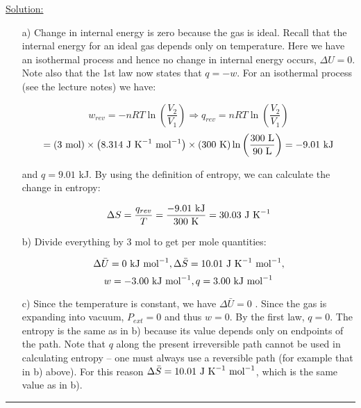 \noindent
\underline{Solution:}\\

\begin{itemize}

\item[a)] Change in internal energy is zero because the gas is ideal. Recall that the internal energy for an ideal gas depends only on temperature. Here we have an isothermal process and hence no change in internal energy occurs, $\Delta U = 0$. Note also that the 1st law now states that $q = -w$. For an isothermal process (see the lecture notes) we have:

$$w_{rev} = -nRT\ln\left(\frac{V_2}{V_1}\right) \Rightarrow q_{rev} = nRT\ln\left(\frac{V_2}{V_1}\right)$$
$$ = \left(3\textnormal{ mol}\right)\times\left(8.314\textnormal{ J K}^{-1}\textnormal{ mol}^{-1}\right)\times\left(300\textnormal{ K}\right)\ln\left(\frac{300\textnormal{ L}}{90\textnormal{ L}}\right) = -9.01\textnormal{ kJ}$$

and $q = 9.01$ kJ. By using the definition of entropy, we can calculate the change in entropy:

$$\Delta S = \frac{q_{rev}}{T} = \frac{-9.01\textnormal{ kJ}}{300\textnormal{ K}} = 30.03\textnormal{ J K}^{-1}$$

\item[b)] Divide everything by 3 mol to get per mole quantities:

$$\Delta\bar{U} = 0\textnormal{ kJ mol}^{-1}, \Delta\bar{S} = 10.01\textnormal{ J K}^{-1}\textnormal{ mol}^{-1},$$
$$ w = -3.00\textnormal{ kJ mol}^{-1}, q = 3.00\textnormal{ kJ mol}^{-1}$$

\item[c)] Since the temperature is constant, we have $\Delta\bar{U} = 0$ . Since the gas is expanding into vacuum, $P_{ext} = 0$ and thus $w = 0$. By the first law, $q = 0$. The entropy is the same as in b) because its value depends only on endpoints of the path. Note that $q$ along the present irreversible path cannot be used in calculating entropy -- one must always use a reversible path (for example that in b) above). For this reason $\Delta\bar{S} = 10.01\textnormal{ J K}^{-1}\textnormal{ mol}^{-1}$, which is the same value as in b).

\end{itemize}

\hrule\vspace{0.5cm}
